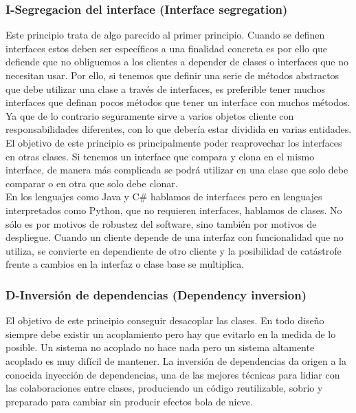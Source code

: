 \documentclass[../pfc.tex]{subfiles}
\begin{document}
	
	\subsubsection{I-Segregacion del interface (Interface segregation)}
	
	Este principio trata de algo parecido al primer principio. Cuando se definen interfaces estos deben ser específicos a una finalidad concreta es por ello que defiende que no obliguemos a los clientes a depender de clases o interfaces que no necesitan usar. Por ello, si tenemos que definir una serie de métodos abstractos que debe utilizar una clase a través de interfaces, es preferible tener muchos interfaces que definan pocos métodos que tener un interface con muchos métodos. Ya que de lo contrario seguramente sirve a varios objetos cliente con responsabilidades diferentes, con lo que debería estar dividida en varias entidades.\\
	
	El objetivo de este principio es principalmente poder reaprovechar los interfaces en otras clases. Si tenemos un interface que compara y clona en el mismo interface, de manera más complicada se podrá utilizar en una clase que solo debe comparar o en otra que solo debe clonar.\\
	
	En los lenguajes como Java y C\# hablamos de interfaces pero en lenguajes interpretados como Python, que no requieren interfaces, hablamos de clases. No sólo es por motivos de robustez del software, sino también por motivos de despliegue. Cuando un cliente depende de una interfaz con funcionalidad que no utiliza, se convierte en dependiente de otro cliente y la posibilidad de catástrofe frente a cambios en la interfaz o clase base se multiplica.\\
	
	
	\subsubsection{D-Inversión de dependencias (Dependency inversion)}
	
	El objetivo de este principio conseguir desacoplar las clases. En todo diseño siempre debe existir un acoplamiento pero hay que evitarlo en la medida de lo posible. Un sistema no acoplado no hace nada pero un sistema altamente acoplado es muy difícil de mantener. La inversión de dependencias da origen a la conocida inyección de dependencias, una de las mejores técnicas para lidiar con las colaboraciones entre clases, produciendo un código reutilizable, sobrio y preparado para cambiar sin producir efectos bola de nieve.\\
	
\end{document}
